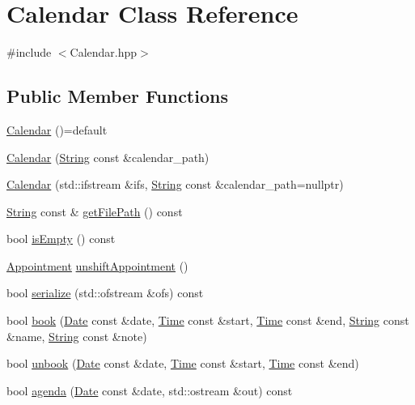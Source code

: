 \hypertarget{classCalendar}{}\section{Calendar Class Reference}
\label{classCalendar}


{\ttfamily \#include $<$Calendar.\+hpp$>$}

\subsection*{Public Member Functions}
\begin{DoxyCompactItemize}
\item 
\hyperlink{classCalendar_a568f7ef431263d9667286aebac96febf}{Calendar} ()=default
\item 
\hyperlink{classCalendar_a54d7e31f38979ee7a363594b86ca9419}{Calendar} (\hyperlink{classString}{String} const \&calendar\+\_\+path)
\item 
\hyperlink{classCalendar_a346673cf7dd15ffa3a2ea292703c5421}{Calendar} (std\+::ifstream \&ifs, \hyperlink{classString}{String} const \&calendar\+\_\+path=nullptr)
\item 
\hyperlink{classString}{String} const  \& \hyperlink{classCalendar_afb5265ef3f8b820048d35dc9921d6789}{get\+File\+Path} () const
\item 
bool \hyperlink{classCalendar_a304110c0454b23f75902ddcddbe8a921}{is\+Empty} () const
\item 
\hyperlink{classAppointment}{Appointment} \hyperlink{classCalendar_a6c94f89713fac92f1544ea3f1b9a8fc9}{unshift\+Appointment} ()
\item 
bool \hyperlink{classCalendar_abd08c73fde62b83cb12afe01ff574223}{serialize} (std\+::ofstream \&ofs) const
\item 
bool \hyperlink{classCalendar_ac50220dec77b2c19f09516ea88e9398c}{book} (\hyperlink{classDate}{Date} const \&date, \hyperlink{classTime}{Time} const \&start, \hyperlink{classTime}{Time} const \&end, \hyperlink{classString}{String} const \&name, \hyperlink{classString}{String} const \&note)
\item 
bool \hyperlink{classCalendar_a24540f159572a53109a20be9ea8f4c5e}{unbook} (\hyperlink{classDate}{Date} const \&date, \hyperlink{classTime}{Time} const \&start, \hyperlink{classTime}{Time} const \&end)
\item 
bool \hyperlink{classCalendar_ac6112aa4e9b3e6e5b9a478ff66789d77}{agenda} (\hyperlink{classDate}{Date} const \&date, std\+::ostream \&out) const
\item 

\end{DoxyCompactItemize}
